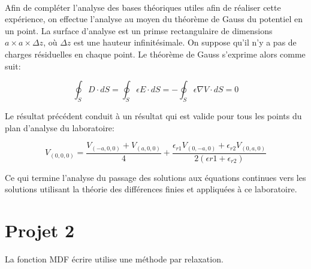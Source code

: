\paragraph{}Afin de compléter l'analyse des bases théoriques utiles afin de réaliser cette expérience, on effectue l'analyse au moyen du théorème de Gauss du potentiel en un point. La surface d'analyse est un primse rectangulaire de dimensions $a \times a \times \Delta z $, où $\Delta z$ est une hauteur infinitésimale. On suppose qu'il n'y a pas de charges résiduelles en chaque point. Le théorème de Gauss s'exprime alors comme suit:

\begin{equation}
\oint_S D \cdot dS = \oint_S \epsilon E \cdot dS = -\oint_S \epsilon \nabla V \cdot dS  = 0
\end{equation}

Le résultat précédent conduit à un résultat qui est valide pour tous les points du plan d'analyse du laboratoire:

\begin{equation}
V_{(0,0,0)} = \frac{V_{(-a,0,0)} + V_{(a,0,0)}}{4} + \frac{\epsilon_{r1} V_{(0,-a,0)} + \epsilon_{r2} V_{(0,a,0)}}{2(\epsilon{r1} + \epsilon_{r2})}
\end{equation}

Ce qui termine l'analyse du passage des solutions aux équations continues vers les solutions utilisant la théorie des différences finies et appliquées à ce laboratoire.
\section{Projet 2}

La fonction MDF écrire utilise une méthode par relaxation. 

